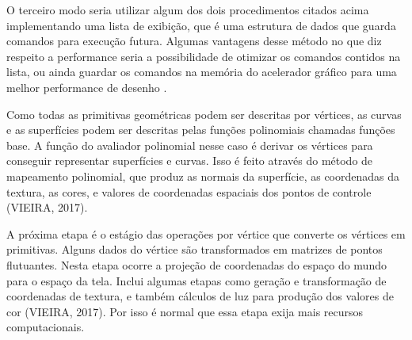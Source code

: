O terceiro modo seria utilizar algum dos dois procedimentos citados acima implementando uma lista de exibição, que é uma estrutura de dados que guarda comandos para execução futura. Algumas vantagens desse método no que diz respeito a performance seria a possibilidade de otimizar os comandos contidos na lista, ou ainda guardar os comandos na memória do acelerador gráfico para uma melhor performance de desenho \cite{GLSLBook}. 

	\begin{figure}[h!]
		\centering
	\end{figure}
	\nocite{pipeline}
	
Como todas as primitivas geométricas podem ser descritas por vértices, as curvas e as superfícies podem ser descritas pelas funções polinomiais chamadas funções base. A função do avaliador polinomial nesse caso é derivar os vértices para conseguir representar superfícies e curvas. Isso é feito através do método de mapeamento polinomial, que produz as normais da superfície, as coordenadas da textura, as cores, e valores de coordenadas espaciais dos pontos de controle (VIEIRA, 2017)\nocite{pipelnRef}.

A próxima etapa é o estágio das operações por vértice que converte os vértices em primitivas. Alguns dados do vértice são transformados em matrizes de pontos flutuantes. Nesta etapa ocorre a projeção de coordenadas do espaço do mundo para o espaço da tela. Inclui algumas etapas como geração e transformação de coordenadas de textura, e também cálculos de luz para produção dos valores de cor (VIEIRA, 2017). Por isso é normal que essa etapa exija mais recursos computacionais. 

